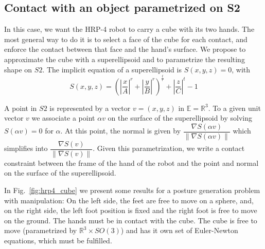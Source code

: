 \subsection{Contact with an object parametrized on S2}

In this case, we want the HRP-4 robot to carry a cube with its two hands.
The most general way to do it is to select a face of the cube for each contact, and enforce the contact between that face and the hand's surface.
We propose to approximate the cube with a superellipsoid and to parametrize the resulting shape on $S2$.
The implicit equation of a superellipsoid is $S(x,y,z) = 0$, with
\begin{equation}
  S(x,y,z) = {\left( \left|\frac{x}{A}\right|^r + \left|\frac{y}{B}\right|^r\right)}^\frac{t}{r} + \left|\frac{z}{C}\right|^t - 1
  \label{eq:super_ellipsoid}
\end{equation}

A point in $S2$ is represented by a vector $v=(x,y,z)$ in $\mathbb{E} = \mathbb{R}^3$.
To a given unit vector $v$ we associate a point $\alpha v$ on the surface of the superellipsoid by solving $S(\alpha v) = 0$ for $\alpha$.
At this point, the normal is given by $\dfrac{\nabla S(\alpha v)}{\left\|\nabla S(\alpha v)\right\|}$ which simplifies into $\dfrac{\nabla S(v)}{\left\|\nabla S(v)\right\|}$.
Given this parametrization, we write a contact constraint between the frame of the hand of the robot and the point and normal on the surface of the superellipsoid.

In Fig.~\ref{fig:hrp4_cube} we present some results for a posture generation problem with manipulation: On the left side, the feet are free to move on a sphere, and, on the right side, the left foot position is fixed and the right foot is free to move on the ground.
The hands must be in contact with the cube.
The cube is free to move (parametrized by $\mathbb{R}^3 \times SO(3)$) and has it own set of Euler-Newton equations, which must be fulfilled.

